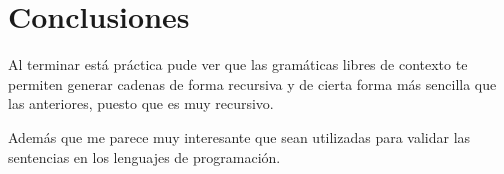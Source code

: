 \documentclass[12pt]{article}
\begin{document}
	\section{Conclusiones}

	Al terminar está práctica pude ver que las gramáticas libres
	de contexto te permiten generar cadenas de forma recursiva y 
	de cierta forma más sencilla que las anteriores, puesto que 
	es muy recursivo.

	Además que me parece muy interesante que sean utilizadas para
	validar las sentencias en los lenguajes de programación.
\end{document}
